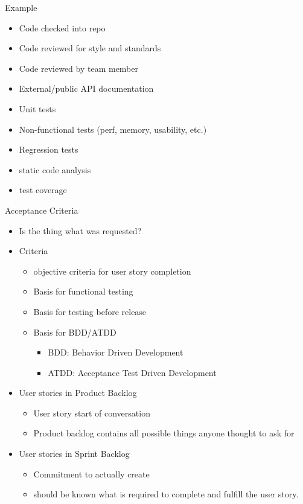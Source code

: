 \documentclass{report}
\begin{document}
\begin{description}
        Example
        \begin{itemize}
            \item Code checked into repo
            \item Code reviewed for style and standards
            \item Code reviewed by team member
            \item External/public API documentation
            \item Unit tests
            \item Non-functional tests (perf, memory, usability, etc.)
            \item Regression tests
            \item static code analysis
            \item test coverage
        \end{itemize}

    \item Acceptance Criteria
        \begin{itemize}
            \item Is the thing what was requested?
            \item Criteria
                \begin{itemize}
                    \item objective criteria for user story
                        completion
                    \item Basis for functional testing
                    \item Basis for testing before release
                    \item Basis for BDD/ATDD
                        \begin{itemize}
                            \item BDD: Behavior Driven Development
                            \item ATDD: Acceptance Test Driven Development
                        \end{itemize}
                \end{itemize}
            \item User stories in Product Backlog
                \begin{itemize}
                    \item User story start of conversation
                    \item Product backlog contains all possible things anyone thought to ask for
                \end{itemize}
            \item User stories in Sprint Backlog
                \begin{itemize}
                    \item Commitment to actually create
                    \item should be known what is required to
                        complete and fulfill the user story.
                \end{itemize}
        \end{itemize}


\end{description}
\end{document}
